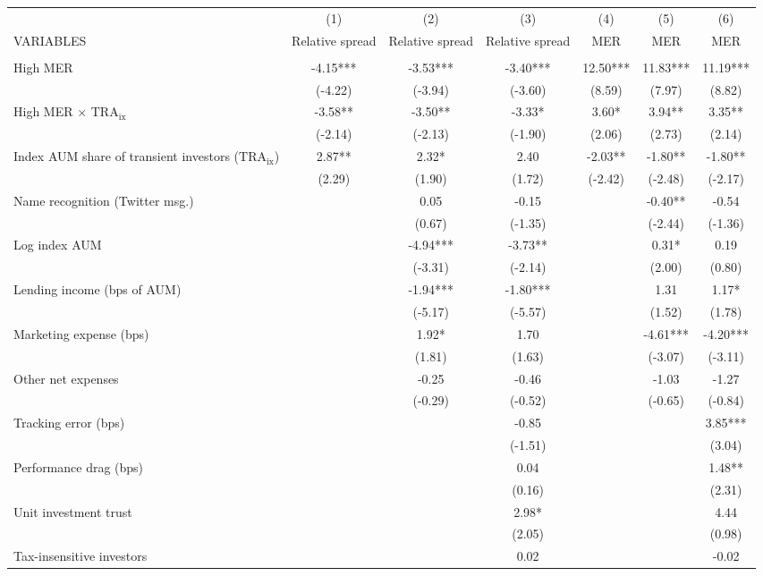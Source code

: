 \documentclass[]{article}
\begin{document}
\begin{tabular}{lcccccc} \hline
 & (1) & (2) & (3) & (4) & (5) & (6) \\
VARIABLES & Relative spread & Relative spread & Relative spread & MER & MER & MER \\ \hline
 &  &  &  &  &  &  \\
High MER & -4.15*** & -3.53*** & -3.40*** & 12.50*** & 11.83*** & 11.19*** \\
 & (-4.22) & (-3.94) & (-3.60) & (8.59) & (7.97) & (8.82) \\
High MER $\times$ $\text{TRA}_\text{ix}$ & -3.58** & -3.50** & -3.33* & 3.60* & 3.94** & 3.35** \\
 & (-2.14) & (-2.13) & (-1.90) & (2.06) & (2.73) & (2.14) \\
Index AUM share of transient investors ($\text{TRA}_\text{ix}$) & 2.87** & 2.32* & 2.40 & -2.03** & -1.80** & -1.80** \\
 & (2.29) & (1.90) & (1.72) & (-2.42) & (-2.48) & (-2.17) \\
Name recognition (Twitter msg.) &  & 0.05 & -0.15 &  & -0.40** & -0.54 \\
 &  & (0.67) & (-1.35) &  & (-2.44) & (-1.36) \\
Log index AUM &  & -4.94*** & -3.73** &  & 0.31* & 0.19 \\
 &  & (-3.31) & (-2.14) &  & (2.00) & (0.80) \\
Lending income (bps of AUM) &  & -1.94*** & -1.80*** &  & 1.31 & 1.17* \\
 &  & (-5.17) & (-5.57) &  & (1.52) & (1.78) \\
Marketing expense (bps) &  & 1.92* & 1.70 &  & -4.61*** & -4.20*** \\
 &  & (1.81) & (1.63) &  & (-3.07) & (-3.11) \\
Other net expenses &  & -0.25 & -0.46 &  & -1.03 & -1.27 \\
 &  & (-0.29) & (-0.52) &  & (-0.65) & (-0.84) \\
Tracking error (bps) &  &  & -0.85 &  &  & 3.85*** \\
 &  &  & (-1.51) &  &  & (3.04) \\
Performance drag (bps) &  &  & 0.04 &  &  & 1.48** \\
 &  &  & (0.16) &  &  & (2.31) \\
Unit investment trust &  &  & 2.98* &  &  & 4.44 \\
 &  &  & (2.05) &  &  & (0.98) \\
Tax-insensitive investors &  &  & 0.02 &  &  & -0.02 \\

\end{tabular}
\end{document}
